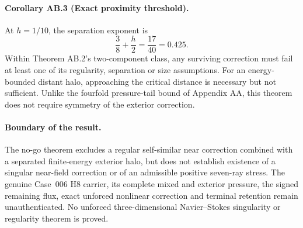 \paragraph{Corollary AB.3 (Exact proximity threshold).}
At $h=1/10$, the separation exponent is
\begin{equation}\label{eq:AB-threshold}
\boxed{\frac38+\frac h2=\frac{17}{40}=0.425.}
\end{equation}
Within Theorem AB.2's two-component class, any surviving correction must fail at least one of its regularity, separation or size assumptions. For an energy-bounded distant halo, approaching the critical distance is necessary but not sufficient. Unlike the fourfold pressure-tail bound of Appendix AA, this theorem does not require symmetry of the exterior correction.

\paragraph{Boundary of the result.}
The no-go theorem excludes a regular self-similar near correction combined with a separated finite-energy exterior halo, but does not establish existence of a singular near-field correction or of an admissible positive seven-ray stress. The genuine Case~006 H8 carrier, its complete mixed and exterior pressure, the signed remaining flux, exact unforced nonlinear correction and terminal retention remain unauthenticated. No unforced three-dimensional Navier--Stokes singularity or regularity theorem is proved.
